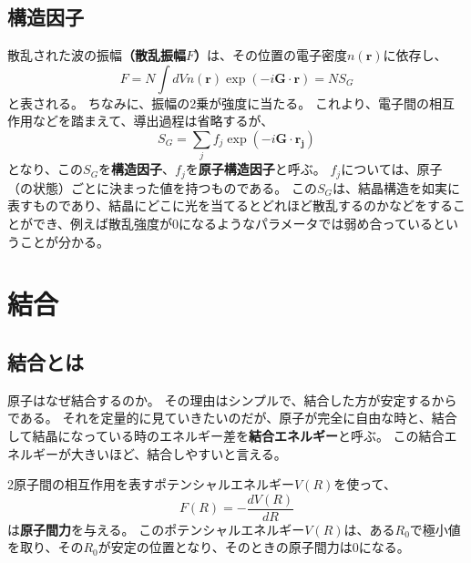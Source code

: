 \documentclass[a4paper]{jsreport}
\begin{document}
        \section{構造因子}
            散乱された波の振幅\textbf{（散乱振幅$F$）}は、その位置の電子密度$n(\boldsymbol{r})$に依存し、
            \begin{equation}
                F = N \int dV n(\boldsymbol{r}) \exp(-i\boldsymbol{G} \cdot \boldsymbol{r}) = NS_G
            \end{equation}
            と表される。
            ちなみに、振幅の2乗が強度に当たる。
            これより、電子間の相互作用などを踏まえて、導出過程は省略するが、
            \begin{equation}
                S_G = \sum_{j}f_j \exp(-i\boldsymbol{G} \cdot \boldsymbol{r_j})
            \end{equation}
            となり、この$S_G$を\textbf{構造因子}、$f_j$を\textbf{原子構造因子}と呼ぶ。
            $f_j$については、原子（の状態）ごとに決まった値を持つものである。
            この$S_G$は、結晶構造を如実に表すものであり、結晶にどこに光を当てるとどれほど散乱するのかなどをすることができ、例えば散乱強度が$0$になるようなパラメータでは弱め合っているということが分かる。

        
        

    \chapter{結合}
        \section{結合とは}
            原子はなぜ結合するのか。
            その理由はシンプルで、結合した方が安定するからである。
            それを定量的に見ていきたいのだが、原子が完全に自由な時と、結合して結晶になっている時のエネルギー差を\textbf{結合エネルギー}と呼ぶ。
            この結合エネルギーが大きいほど、結合しやすいと言える。\par
            2原子間の相互作用を表すポテンシャルエネルギー$V(R)$を使って、
            \begin{equation}
                F(R) = - \frac{dV(R)}{dR}
            \end{equation}
            は\textbf{原子間力}を与える。
            このポテンシャルエネルギー$V(R)$は、ある$R_0$で極小値を取り、その$R_0$が安定の位置となり、そのときの原子間力は$0$になる。\par
\end{document}
